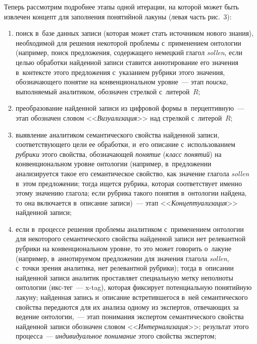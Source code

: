 {\begin{multicols}{2}
  Теперь рассмотрим подробнее этапы одной итерации, на которой может быть 
извлечен концепт 
 для заполнения понятийной лакуны (левая часть рис.~3):
  \begin{enumerate}[(1)]
\item поиск в~базе данных записи (которая может стать источником нового 
знания), необходимой для решения некоторой проблемы с~применением 
онтологии (например, поиск предложения, содержащего немецкий глагол 
\textit{sollen}, если целью обработки найденной записи ставится 
аннотирование его значения в~контексте этого предложения с~указанием 
рубрики этого значения, обозначающего понятие на конвенциональном 
уровне~--- этап \textit{поиска}, выполняемый аналитиком, обозначен 
стрелкой с~литерой~$R$;
\item преобразование найденной записи из цифровой формы 
в~перцептивную~---  этап обозначен словом <<\textit{Визуализация}>> над 
стрелкой с~литерой~$R$;
\item выявление аналитиком семантического свойства найденной записи, 
соответствующего цели ее обработки, и~его описание с~использованием 
\textit{рубрики} этого свойства, обозначающей \textit{понятие} (\textit{класс 
понятий}) на конвенциональном уровне онтологии (например, 
в~предложении анализируется такое его семантическое свойство, как 
значение глагола \textit{sollen} в~этом предложении; тогда ищется рубрика, 
которая соответствует именно этому значению глагола; если рубрика такого 
понятия в~онтологии найде\-на, то она включается в~описание записи)~--- этап 
<<\textit{Концептуализация}>> найденной записи;
\item если в~процессе решения проблемы аналитиком с~применением 
онтологии для некоторого семантического свойства найденной записи нет 
релевантной рубрики на конвенциональном уровне, то это может говорить 
о~лакуне (например, в~аннотируемом предложении для значения глагола 
\textit{sollen}, с~точки зрения аналитика, нет релевантной рубрики); тогда 
в~описании найденной записи аналитик проставляет специальную метку 
неполноты онтологии (икс-тег~--- x-tag), которая фиксирует потенциальную 
понятийную лакуну; найденная запись и~описание встретившегося в~ней 
семантического свойства передаются для их анализа одному из экспертов, 
отвечающих за ведение онтологии,~--- этап понимания экспертом 
семантического свойства найденной записи обозначен словом 
<<\textit{Интернализация}>>; результат этого процесса~--- 
\textit{индивидуальное понимание} этого свойства экспертом;



\end{enumerate}
\end{multicols}}
